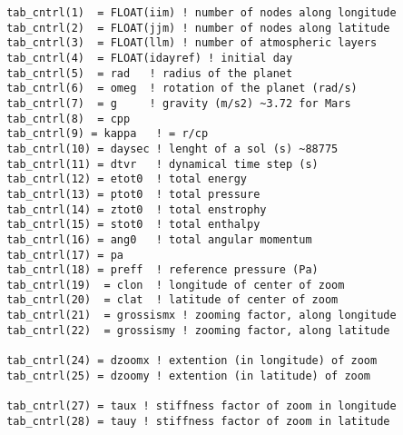 {\footnotesize
\begin{verbatim}
       tab_cntrl(1)  = FLOAT(iim) ! number of nodes along longitude
       tab_cntrl(2)  = FLOAT(jjm) ! number of nodes along latitude
       tab_cntrl(3)  = FLOAT(llm) ! number of atmospheric layers
       tab_cntrl(4)  = FLOAT(idayref) ! initial day 
       tab_cntrl(5)  = rad   ! radius of the planet
       tab_cntrl(6)  = omeg  ! rotation of the planet (rad/s)
       tab_cntrl(7)  = g     ! gravity (m/s2) ~3.72 for Mars
       tab_cntrl(8)  = cpp 
       tab_cntrl(9) = kappa   ! = r/cp
       tab_cntrl(10) = daysec ! lenght of a sol (s) ~88775
       tab_cntrl(11) = dtvr   ! dynamical time step (s)
       tab_cntrl(12) = etot0  ! total energy
       tab_cntrl(13) = ptot0  ! total pressure
       tab_cntrl(14) = ztot0  ! total enstrophy
       tab_cntrl(15) = stot0  ! total enthalpy
       tab_cntrl(16) = ang0   ! total angular momentum
       tab_cntrl(17) = pa     
       tab_cntrl(18) = preff  ! reference pressure (Pa)
       tab_cntrl(19)  = clon  ! longitude of center of zoom
       tab_cntrl(20)  = clat  ! latitude of center of zoom
       tab_cntrl(21)  = grossismx ! zooming factor, along longitude
       tab_cntrl(22)  = grossismy ! zooming factor, along latitude

       tab_cntrl(24) = dzoomx ! extention (in longitude) of zoom
       tab_cntrl(25) = dzoomy ! extention (in latitude) of zoom

       tab_cntrl(27) = taux ! stiffness factor of zoom in longitude
       tab_cntrl(28) = tauy ! stiffness factor of zoom in latitude
\end{verbatim}
}

